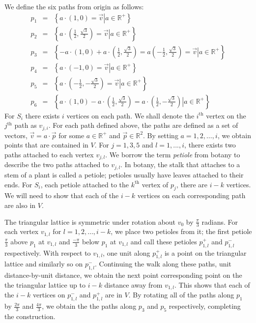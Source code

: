 \documentclass[10pt]{CSUNthesis}
\theoremstyle{plain}%
\theoremstyle{definition}
\theoremstyle{remark}
\newcommand{\bbR}{{\mathbb{R}}}
\newcommand{\set}[2]{{\left\lbrace \left.  #1 \left\vert #2  \right.\right.\right\rbrace  }}
\newcommand{\lr}[1]{\left( #1 \right)}
\begin{document}
We define the six paths from origin as follows:      
\begin{eqnarray*}
p_1 &=& \set{a\cdot\lr{1,0} = \vec{v}}{a \in \bbR^+}\\
p_2 &=& \set{a\cdot\lr{\frac{1}{2},\frac{\sqrt{3}}{2}} = \vec{v}}{a \in \bbR^+}\\
p_3 &=& \set{-a\cdot \lr{1,0} + a \cdot \lr{\frac{1}{2},\frac{\sqrt{3}}{2}} = a\lr{-\frac{1}{2},\frac{\sqrt{3}}{2}} = \vec{v}}{a \in \bbR^+}\\
p_4 &=& \set{a \cdot \lr{-1,0} = \vec{v}}{a \in \bbR^+}\\
p_5 &=& \set{a \cdot \lr{-\frac{1}{2},-\frac{\sqrt{3}}{2}}  = \vec{v}}{a \in \bbR^+}\\
p_6 &=& \set{ a\cdot \lr{1,0} - a \cdot \lr{\frac{1}{2},\frac{\sqrt{3}}{2}}= a \cdot \lr{\frac{1}{2}, -\frac{\sqrt{3}}{2}}}{a \in \bbR^+} 
\end{eqnarray*}
For $S_i$ there exists $i$ vertices on each path.  
We shall denote the $i^\text{th}$ vertex on the $j^\text{th}$ path as $v_{j,i}$.  
For each path defined above, the paths are defined as a set of vectors, $\vec{v} = a \cdot \vec{p}$  for some $a \in \bbR^+$ and $\vec{p} \in \bbR^2$.  
By setting $a = 1,2,\dots, i$, we obtain points that are contained in $V$.  
For $j = 1,3,5$ and $l = 1,..., i$, there exists two paths attached to each vertex $v_{j,l}$.  
We borrow the term \textit{petiole} from botany to describe the two paths attached to $v_{j,l}$.  
In botany, the stalk that attaches to a stem of a plant is called a petiole; petioles usually have leaves attached to their ends.  
For $S_i$, each petiole attached to the $k^\text{th}$ vertex of $p_j$, there are $i-k$ vertices.  
We will need to show that each of the $i-k$ vertices on each corresponding path are also in $V$.  

The triangular lattice is symmetric under rotation about $v_0$ by $\frac{\pi}{3}$ radians.  
For each vertex $v_{1,l}$ for $l=1,2,\dots, i-k$, we place two petioles from it; the first petiole $\frac{\pi}{3}$ above $p_1$ at $v_{1,l}$ and $\frac{-\pi}{3}$ below $p_1$ at $v_{1,l}$ and call these petioles $p_{1,l}^+$ and $p_{1,l}^-$ respectively.  
With respect to $v_{1,l}$, one unit along $p_{1,l}^+$ is a point on the triangular lattice and similarly so on $p_{1,l}^-$.  
Continuing the walk along these paths, unit distance-by-unit distance, we obtain the next point corresponding point on the the triangular lattice up to $i-k$ distance away from $v_{1,l}$.  
This shows that each of the $i-k$ vertices on $p_{1,l}^-$ and $p_{1,l}^+$ are in $V$.  
By rotating all of the paths along $p_1$ by $\frac{2\pi}{3}$ and $\frac{4\pi}{3}$, we obtain the the paths along $p_3$ and $p_5$ respectively, completing the construction.
\end{document}
